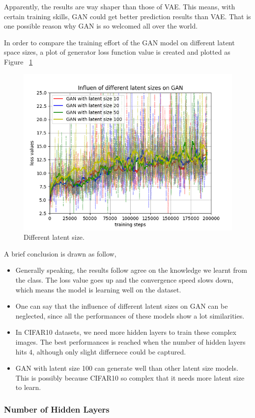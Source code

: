 \documentclass[12pt,letterpaper]{article}
\begin{document}
Apparently, the results are way shaper than those of VAE. This means, with certain training skills, GAN could get better prediction results than VAE. That is one possible reason why GAN is so welcomed all over the world.

In order to compare the training effort of the GAN model on different latent space sizes, a plot of generator loss function value is created and plotted as Figure ~\ref{fig:gen_latent_CIFAR}
\begin{figure}[h]
    \centering
    \includegraphics[width=.5\linewidth]{GAN_CIFAR_latents.png}
    \caption{\small Different latent size.}
    \label{fig:gen_latent_CIFAR}
\end{figure}

A brief conclusion is drawn as follow,
\begin{itemize}
    \item Generally speaking, the results follow agree on the knowledge we learnt from the class. The loss value goes up and the convergence speed slows down, which means the model is learning well on the dataset.
    \item One can say that the influence of different latent sizes on GAN can be neglected, since all the performances of these models show a lot similarities.
    \item In CIFAR10 datasets, we need more hidden layers to train these complex images. The best performances is reached when the number of hidden layers hits $4$, although only slight differnece could be captured.
    \item GAN with latent size 100 can generate well than other latent size models. This is possibly because CIFAR10 so complex that it needs more latent size to learn.
\end{itemize}

\subsubsection{Number of Hidden Layers}
\end{document}
